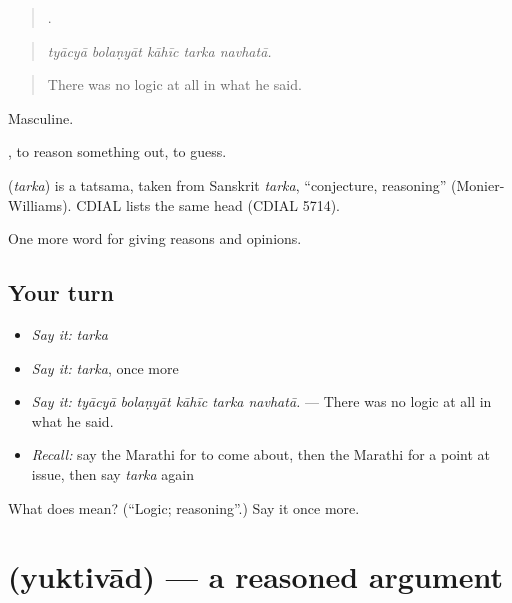 \begin{quote}
    .
\end{quote}

\begin{quote}
\emph{tyācyā bolaṇyāt kāhīc tarka navhatā.}
\end{quote}

\begin{quote}
There was no logic at all in what he said.
\end{quote}

Masculine.

 , to reason something out, to guess.

\begin{cousinweb}
\textbf{} (\emph{tarka}) is a tatsama, taken from Sanskrit \emph{tarka}, \textquotedblleft{}conjecture, reasoning\textquotedblright{} (Monier-Williams). CDIAL lists the same head (CDIAL 5714).
\end{cousinweb}

\begin{grammarlens}[title={What you've built}]
One more word for giving reasons and opinions.
\end{grammarlens}

\subsection*{Your turn}
\begin{itemize}
\raggedright
  \item \emph{Say it:} \emph{tarka}
  \item \emph{Say it:} \emph{tarka}, once more
  \item \emph{Say it:} \emph{tyācyā bolaṇyāt kāhīc tarka navhatā.} — There was no logic at all in what he said.
  \item \emph{Recall:} say the Marathi for to come about, then the Marathi for a point at issue, then say \emph{tarka} again
\end{itemize}

\begin{tcolorbox}[breakable,colback=teal!4,colframe=teal!35!black,title={Before you move on}]
What does  mean? (\textquotedblleft{}Logic; reasoning\textquotedblright{}.) Say it once more.
\end{tcolorbox}
\section[\texorpdfstring{\mr{युक्तिवाद} (yuktivād)}{युक्तिवाद (yuktivād)}]{ (yuktivād) — a reasoned argument}

